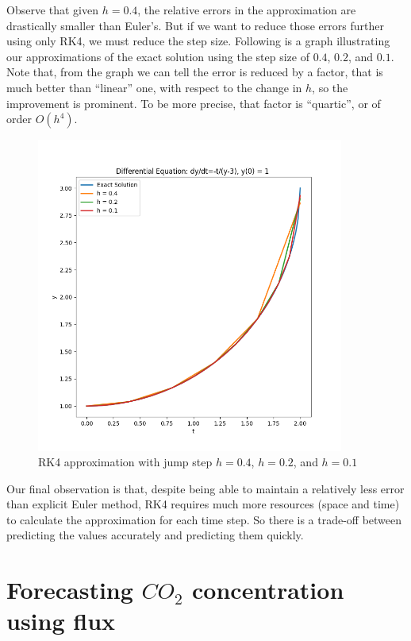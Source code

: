 \documentclass[a4paper]{article}
\numberwithin{equation}{section}
\begin{document}
Observe that given \(h = 0.4\), the relative errors in the approximation are drastically smaller than Euler's. But if we want to reduce those errors further using only RK4, we must reduce the step size. Following is a graph illustrating our approximations of the exact solution using the step size of \(0.4\), \(0.2\), and \(0.1\). Note that, from the graph we can tell the error is reduced by a factor, that is much better than ``linear'' one, with respect to the change in \(h\), so the improvement is prominent. To be more precise, that factor is ``quartic'', or of order \(O(h^4)\).

\begin{figure}[H]
  \centering
  \includegraphics[width=0.9\textwidth]{plot_runge_kutta.png}
  \caption{RK4 approximation with jump step \(h = 0.4\), \(h = 0.2\), and \(h = 0.1\)}
\end{figure}

Our final observation is that, despite being able to maintain a relatively less error than explicit Euler method, RK4 requires much more resources (space and time) to calculate the approximation for each time step. So there is a trade-off between predicting the values accurately and predicting them quickly.

\newpage
\section{Forecasting \texorpdfstring{\(CO_2\)}{} concentration using flux}
\end{document}
